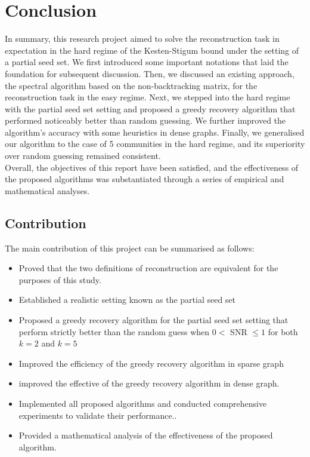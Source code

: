 \chapter{Conclusion}\label{chapter 6}
In summary, this research project aimed to solve the reconstruction task in expectation in the hard regime of the Kesten-Stigum bound under the setting of a partial seed set. We first introduced some important notations that laid the foundation for subsequent discussion. Then, we discussed an existing approach, the spectral algorithm based on the non-backtracking matrix, for the reconstruction task in the easy regime. Next, we stepped into the hard regime with the partial seed set setting and proposed a greedy recovery algorithm that performed noticeably better than random guessing. We further improved the algorithm's accuracy with some heuristics in dense graphs. Finally, we generalised our algorithm to the case of 5 communities in the hard regime, and its superiority over random guessing remained consistent.\\
Overall, the objectives of this report have been satisfied, and the effectiveness of the proposed algorithms was substantiated through a series of empirical and mathematical analyses.
\section{Contribution}
The main contribution of this project can be summarised as follows:
\begin{itemize}
    \item Proved that the two definitions of reconstruction are equivalent for the purposes of this study.
    \item Established a realistic setting known as the partial seed set
    \item Proposed a greedy recovery algorithm for the partial seed set setting that perform strictly better than the random guess when $0<$ SNR $\leq1$ for both $k=2$ and $k=5$
    \item Improved the efficiency of the greedy recovery algorithm in sparse graph
    \item improved the effective of the greedy recovery algorithm in dense graph.
    \item  Implemented all proposed algorithms and conducted comprehensive experiments to validate their performance..
    \item Provided a mathematical analysis of the effectiveness of the proposed algorithm.
\end{itemize}
